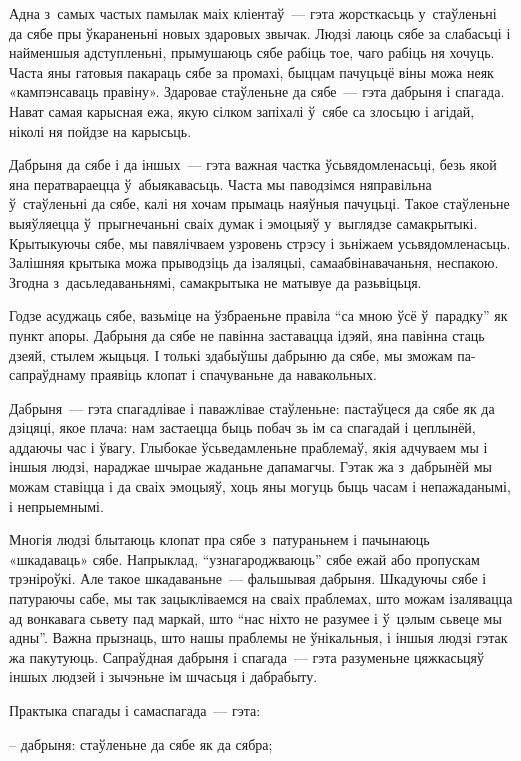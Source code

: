 Адна з~самых частых памылак маіх кліентаў~--- гэта жорсткасьць у~стаўленьні да сябе пры ўкараненьні новых здаровых звычак. Людзі лаюць сябе за слабасьці і найменшыя адступленьні, прымушаюць сябе рабіць тое, чаго рабіць ня хочуць. Часта яны гатовыя пакараць сябе за промахі, быццам пачуцьцё віны можа неяк «кампэнсаваць правіну». Здаровае стаўленьне да сябе~--- гэта дабрыня і спагада. Нават самая карысная ежа, якую сілком запіхалі ў~сябе са злосьцю і агідай, ніколі ня пойдзе на карысьць. 

Дабрыня да сябе і да іншых~--- гэта важная частка ўсьвядомленасьці, безь якой яна ператвараецца ў~абыякавасьць. Часта мы паводзімся няправільна ў~стаўленьні да сябе, калі ня хочам прымаць наяўныя пачуцьці. Такое стаўленьне выяўляецца ў~прыгнечаньні сваіх думак і эмоцыяў у~выглядзе самакрытыкі. Крытыкуючы сябе, мы павялічваем узровень стрэсу і зьніжаем усьвядомленасьць. Залішняя крытыка можа прыводзіць да ізаляцыі, самаабвінавачаньня, неспакою. Згодна з~дасьледаваньнямі, самакрытыка не матывуе да разьвіцьця.

Годзе асуджаць сябе, вазьміце на ўзбраеньне правіла ``са мною ўсё ў~парадку'' як пункт апоры. Дабрыня да сябе не павінна заставацца ідэяй, яна павінна стаць дзеяй, стылем жыцьця. І толькі здабыўшы дабрыню да сябе, мы зможам па-сапраўднаму праявіць клопат і спачуваньне да навакольных.

Дабрыня~--- гэта спагадлівае і паважлівае стаўленьне: пастаўцеся да сябе як да дзіцяці, якое плача: нам застаецца быць побач зь ім са спагадай і цеплынёй, аддаючы час і ўвагу. Глыбокае ўсьведамленьне праблемаў, якія адчуваем мы і іншыя людзі, нараджае шчырае жаданьне дапамагчы. Гэтак жа з~дабрынёй мы можам ставіцца і да сваіх эмоцыяў, хоць яны могуць быць часам і непажаданымі, і непрыемнымі.

Многія людзі блытаюць клопат пра сябе з~патураньнем і пачынаюць «шкадаваць» сябе. Напрыклад, ``узнагароджваюць'' сябе ежай або пропускам трэніроўкі. Але такое шкадаваньне~--- фальшывая дабрыня. Шкадуючы сябе і патураючы сабе, мы так зацыкліваемся на сваіх праблемах, што можам ізалявацца ад вонкавага сьвету пад маркай, што ``нас ніхто не разумее і ў~цэлым сьвеце мы адны''. Важна прызнаць, што нашы праблемы не ўнікальныя, і іншыя людзі гэтак жа пакутуюць. Сапраўдная дабрыня і спагада~--- гэта разуменьне цяжкасьцяў іншых людзей і зычэньне ім шчасьця і дабрабыту.

Практыка спагады і самаспагада~--- гэта: 

– дабрыня: стаўленьне да сябе як да сябра;

